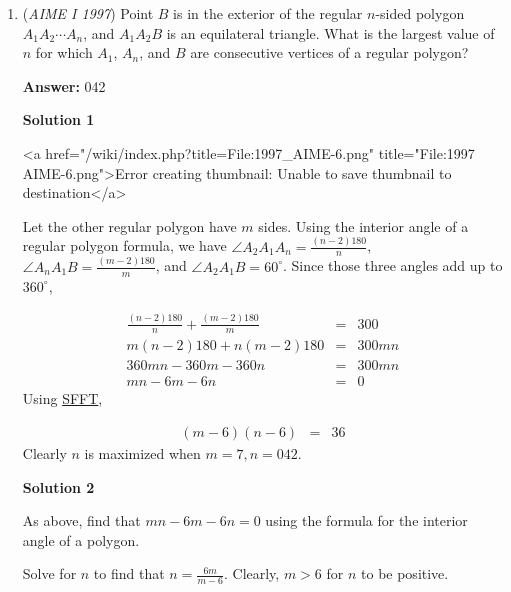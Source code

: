 \begin{enumerate}
 Thus $r$ can range between $\frac{\frac 14 + \frac{2}{7}}{2} \approx .267857$ and $\frac{\frac 13 + \frac{2}{7}}{2} \approx .309523$. At $r = .2678, .3096$, it becomes closer to the other fractions, so $.2679 \le r \le .3095$ and the number of values of $r$ is $3095 - 2679 + 1 = \boxed{417}$.

 


	\item (\textit{AIME I 1997}) Point $B$ is in the exterior of the regular $n$-sided polygon $A_1A_2\cdots A_n$, and $A_1A_2B$ is an equilateral triangle. What is the largest value of $n$ for which $A_1$, $A_n$, and $B$ are consecutive vertices of a regular polygon?


 
 \textbf{Answer: }042



\textbf{Solution 1}

<a href="/wiki/index.php?title=File:1997\_AIME-6.png" title="File:1997 AIME-6.png">Error creating thumbnail: Unable to save thumbnail to destination</a>

 Let the other regular polygon have $m$ sides. Using the interior angle of a regular polygon formula, we have $\angle A_2A_1A_n = \frac{(n-2)180}{n}$, $\angle A_nA_1B = \frac{(m-2)180}{m}$, and $\angle A_2A_1B = 60^{\circ}$. Since those three angles add up to $360^{\circ}$,

 
 \begin{eqnarray*} \frac{(n-2)180}{n} + \frac{(m-2)180}{m} &=& 300\\ m(n-2)180 + n(m-2)180 &=& 300mn\\ 360mn - 360m - 360n &=& 300mn\\ mn - 6m - 6n &=& 0 \end{eqnarray*}Using \href{https://artofproblemsolving.com/wiki/index.php?title=Simon\%27s\_Favorite\_Factoring\_Trick}{SFFT}, 

 
 \begin{eqnarray*} (m-6)(n-6) &=& 36 \end{eqnarray*}Clearly $n$ is maximized when $m = 7, n = \boxed{042}$.

 



\textbf{Solution 2}

As above, find that $mn - 6m - 6n = 0$ using the formula for the interior angle of a polygon.  

 Solve for $n$ to find that $n = \frac{6m}{m-6}$.  Clearly, $m>6$ for $n$ to be positive.


\end{enumerate}
